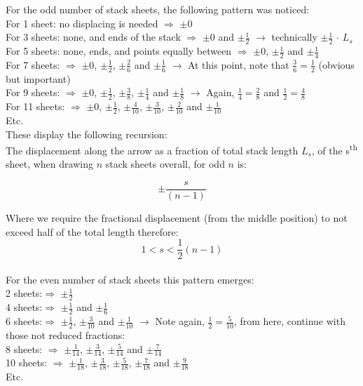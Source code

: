 \documentclass[11]{report}
\begin{document}
For the odd number of stack sheets, the following pattern was noticed:\\
For 1 sheet: no displacing is needed $\Rightarrow$ $\pm0$ \\
For 3 sheets: none, and ends of the stack $\Rightarrow$ $\pm0$ and  $\pm\frac{1}{2}$ $\longrightarrow$ technically $\pm\frac{1}{2}$ $\cdot$ $L_s$\\
For 5 sheets: none, ends, and points equally between $\Rightarrow$ $\pm0$, $\pm\frac{1}{2}$ and $\pm\frac{1}{4}$\\
For 7 sheets: $\Rightarrow$ $\pm0$, $\pm\frac{1}{2}$, $\pm\frac{2}{6}$ and $\pm\frac{1}{6}$ $\longrightarrow$ At this point, note that $\frac{3}{6} = \frac{1}{2}$ (obvious but important)\\
For 9 sheets: $\Rightarrow$ $\pm0$, $\pm\frac{1}{2}$, $\pm\frac{3}{8}$, $\pm\frac{1}{4}$ and $\pm\frac{1}{8}$ $\longrightarrow$ Again, $\frac{1}{4} = \frac{2}{8}$ and $\frac{1}{2} = \frac{4}{8}$\\
For 11 sheets: $\Rightarrow$ $\pm0$, $\pm\frac{1}{2}$, $\pm\frac{4}{10}$, $\pm\frac{3}{10}$, $\pm\frac{2}{10}$  and $\pm\frac{1}{10}$\\
Etc.\\

These display the following recursion:\\
The displacement along the arrow as a fraction of total stack length $L_s$, of the s\textsuperscript{th} sheet, when drawing $n$ stack sheets overall, for odd $n$ is:

\[ \pm{ \frac{s}{ \left( n-1 \right) }} \]

Where we require the fractional displacement (from the middle position) to not exceed half of the total length therefore:\\
\[ 1 < s < \frac{1}{2} \left( n-1 \right) \]\\

For the even number of stack sheets this pattern emerges:\\
2 sheets:$\Rightarrow$ $\pm\frac{1}{2}$\\
4 sheets:$\Rightarrow$ $\pm\frac{1}{2}$ and $\pm\frac{1}{6}$\\
6 sheets:$\Rightarrow$ $\pm\frac{1}{2}$, $\pm\frac{3}{10}$ and $\pm\frac{1}{10}$ $\longrightarrow$ Note again, $\frac{1}{2} = \frac{5}{10}$, from here, continue with those not reduced fractions:\\
8 sheets: $\Rightarrow$ $\pm\frac{1}{14}$, $\pm\frac{3}{14}$, $\pm\frac{5}{14}$ and $\pm\frac{7}{14}$\\
10 sheets:  $\Rightarrow$ $\pm\frac{1}{18}$, $\pm\frac{3}{18}$, $\pm\frac{5}{18}$, $\pm\frac{7}{18}$ and $\pm\frac{9}{18}$\\
Etc.\\
\end{document}
